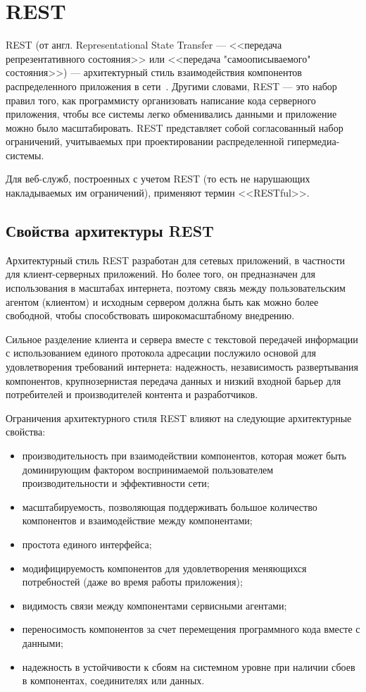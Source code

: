 \documentclass[a4page]{article}
\begin{document}
\newpage
\section{REST}
REST (от англ. Representational State Transfer ---
<<передача репрезентативного состояния>> или <<передача "самоописываемого" состояния>>) ---
архитектурный стиль взаимодействия компонентов распределенного приложения в сети~\cite{REST}.
Другими словами, REST --- это набор правил того,
как программисту организовать написание кода серверного приложения,
чтобы все системы легко обменивались данными и приложение можно было масштабировать.
REST представляет собой согласованный набор ограничений,
учитываемых при проектировании распределенной гипермедиа-системы.

Для веб-служб, построенных с учетом REST (то есть не нарушающих накладываемых им ограничений),
применяют термин <<RESTful>>.

\subsection{Свойства архитектуры REST}
Архитектурный стиль REST разработан для сетевых приложений,
в частности для клиент-серверных приложений.
Но более того, он предназначен для использования в масштабах интернета,
поэтому связь между пользовательским агентом (клиентом) и
исходным сервером должна быть как можно более свободной,
чтобы способствовать широкомасштабному внедрению.

Сильное разделение клиента и сервера вместе с текстовой передачей информации
с использованием единого протокола адресации послужило основой для удовлетворения требований интернета:
надежность, независимость развертывания компонентов,
крупнозернистая передача данных и низкий входной барьер для потребителей и
производителей контента и разработчиков.

Ограничения архитектурного стиля REST влияют на следующие архитектурные свойства:

\begin{itemize}
	\item производительность при взаимодействии компонентов,
	      которая может быть доминирующим фактором воспринимаемой
	      пользователем производительности и эффективности сети;
	\item масштабируемость, позволяющая поддерживать большое количество компонентов
	      и взаимодействие между компонентами;
	\item простота единого интерфейса;
	\item модифицируемость компонентов для удовлетворения меняющихся потребностей
	      (даже во время работы приложения);
	\item видимость связи между компонентами сервисными агентами;
	\item переносимость компонентов за счет перемещения программного кода вместе с данными;
	\item надежность в устойчивости к сбоям на системном уровне при наличии сбоев в компонентах,
	      соединителях или данных.
\end{itemize}
\end{document}
